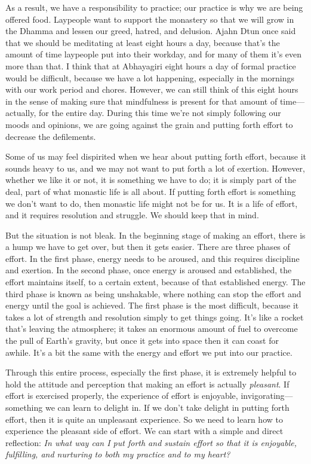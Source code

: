 As a result, we have a responsibility to practice; our practice is why 
we are being offered food. Laypeople want to support the monastery so 
that we will grow in the Dhamma and lessen our greed, hatred, and 
delusion. Ajahn Dtun once said that we should be meditating at least 
eight hours a day, because that's the amount of time laypeople put into 
their workday, and for many of them it's even more than that. I think 
that at Abhayagiri eight hours a day of formal practice would be 
difficult, because we have a lot happening, especially in the mornings 
with our work period and chores. However, we can still think of this 
eight hours in the sense of making sure that mindfulness is present for 
that amount of time---actually, for the entire day. During this time 
we're not simply following our moods and opinions, we are going against 
the grain and putting forth effort to decrease the defilements.

Some of us may feel dispirited when we hear about putting forth effort, 
because it sounds heavy to us, and we may not want to put forth a lot 
of exertion. However, whether we like it or not, it is something we 
have to do; it is simply part of the deal, part of what monastic life 
is all about. If putting forth effort is something we don't want to do, 
then monastic life might not be for us. It is a life of effort, and it 
requires resolution and struggle. We should keep that in mind.

But the situation is not bleak. In the beginning stage of making an 
effort, there is a hump we have to get over, but then it gets easier. 
There are three phases of effort. In the first phase, energy needs to 
be aroused, and this requires discipline and exertion. In the second 
phase, once energy is aroused and established, the effort maintains 
itself, to a certain extent, because of that established energy. The 
third phase is known as being unshakable, where nothing can stop the 
effort and energy until the goal is achieved. The first phase is the 
most difficult, because it takes a lot of strength and resolution 
simply to get things going. It's like a rocket that's leaving the 
atmosphere; it takes an enormous amount of fuel to overcome the pull of 
Earth's gravity, but once it gets into space then it can coast for 
awhile. It's a bit the same with the energy and effort we put into our 
practice.

Through this entire process, especially the first phase, it is 
extremely helpful to hold the attitude and perception that making an 
effort is actually \emph{pleasant}. If effort is exercised properly, 
the experience of effort is enjoyable, invigorating---something we can 
learn to delight in. If we don't take delight in putting forth effort, 
then it is quite an unpleasant experience. So we need to learn how to 
experience the pleasant side of effort. We can start with a simple and 
direct reflection: \emph{In what way can I put forth and sustain effort 
so that it is enjoyable, fulfilling, and nurturing to both my practice 
and to my heart?}

